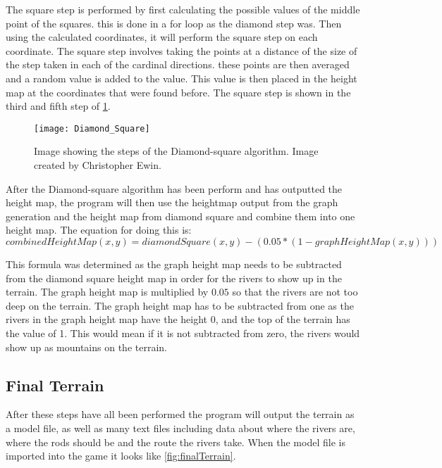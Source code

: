 
	The square step is performed by first calculating the possible values of the middle point of the squares. this is done in a for loop as the diamond step was. Then using the calculated coordinates, it will perform the square step on each coordinate. The square step involves taking the points at a distance of the size of the step taken in each of the cardinal directions. these points are then averaged and a random value is added to the value. This value is then placed in the height map at the coordinates that were found before. The square step is shown in the third and fifth step of \ref{fig:DiamondSquare}.

\begin{figure}[H]
	\texttt{[image: Diamond\_Square]}
	\centering
	\caption{Image showing the steps of the Diamond-square algorithm. Image created by Christopher Ewin.}
	\label{fig:DiamondSquare}
\end{figure}

	After the Diamond-square algorithm has been perform and has outputted the height map, the program will then use the heightmap output from the graph generation and the height map from diamond square and combine them into one height map. The equation for doing this is:\\

	$$combinedHeightMap(x, y) =  diamondSquare(x, y) - (0.05 * (1 - graphHeightMap(x, y)))$$

	This formula was determined as the graph height map needs to be subtracted from the diamond square height map in order for the rivers to show up in the terrain. The graph height map is multiplied by $0.05$ so that the rivers are not too deep on the terrain. The graph height map has to be subtracted from one as the rivers in the graph height map have the height 0, and the top of the terrain has the value of 1. This would mean if it is not subtracted from zero, the rivers would show up as mountains on the terrain.\\

\subsection{Final Terrain}
	After these steps have all been performed the program will output the terrain as a model file, as well as many text files including data about where the rivers are, where the rods should be and the route the rivers take. When the model file is imported into the game it looks like \ref{fig:finalTerrain}.

